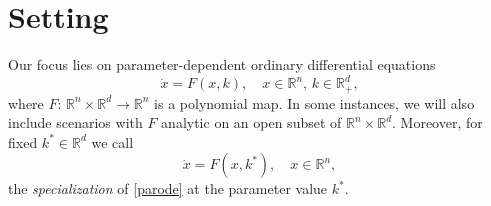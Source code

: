 \documentclass{article}
\begin{document}
\section{Setting}

Our focus lies on parameter-dependent ordinary differential equations
\begin{equation}\label{parode}
\dot x=F(x,k), \quad x\in \mathbb R^n,\, k\in \mathbb R_{+}^d,
\end{equation}
where $F:\,\mathbb R^n\times\mathbb R^d\to \mathbb R^n$ is a polynomial map. In some instances, we will also include scenarios with $F$ analytic on an open subset of $\mathbb R^n\times\mathbb R^d$. Moreover, for fixed $k^*\in \mathbb R^d$ we call
\begin{equation}\label{parodes}
\dot x=F(x,k^*), \quad x\in \mathbb R^n,
\end{equation}
the {\em specialization} of \eqref{parode} at the parameter value $k^*$.
\end{document}
